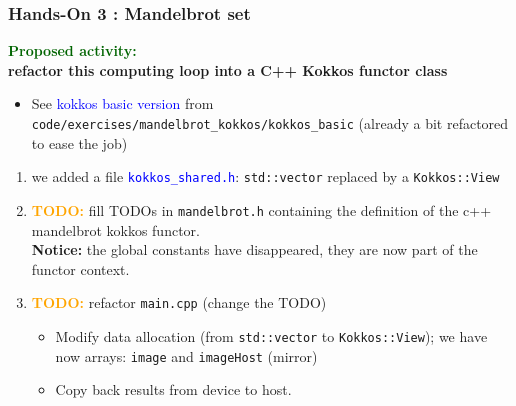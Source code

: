 \begin{frame}[fragile=singleslide]
  \frametitle{Hands-On 3 : Mandelbrot set}

  {\Large \textcolor{darkgreen}{\textbf{Proposed activity:}}\\ \textbf{refactor this computing loop into a C++ Kokkos functor class}}
  \begin{itemize}
  \item See \textcolor{blue}{kokkos basic version} from \texttt{code/exercises/mandelbrot\_kokkos/kokkos\_basic} (already a bit refactored to ease the job)
  \end{itemize}
  \begin{enumerate}
  \item we added a file \textcolor{blue}{\texttt{kokkos\_shared.h}}: \texttt{std::vector} replaced by a \texttt{Kokkos::View}
  \item \textcolor{orange}{\textbf{TODO:}} fill TODOs in \texttt{mandelbrot.h} containing the definition of the c++ mandelbrot kokkos functor.\\
    \textbf{Notice:} the global constants have disappeared, they are now part of the functor context.
  \item \textcolor{orange}{\textbf{TODO:}} refactor \texttt{main.cpp} (change the TODO)
    \begin{itemize}
    \item Modify data allocation (from \texttt{std::vector} to \texttt{Kokkos::View}); we have now arrays: \texttt{image} and \texttt{imageHost} (mirror)
    \item Copy back results from device to host.
    \end{itemize}
  \end{enumerate}
  
\end{frame}

